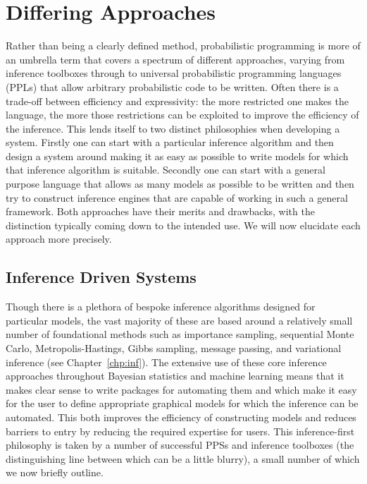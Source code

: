 
\section{Differing Approaches}
\label{sec:probprog:two}

Rather than being a clearly defined method,
probabilistic programming is more of an umbrella term that covers a spectrum of 
different approaches, varying from inference toolboxes through to universal probabilistic programming
languages (PPLs) that allow
arbitrary probabilistic code to be written.
Often there is a trade-off between efficiency and expressivity: the more restricted
one makes the language, the more those restrictions can be exploited to improve the efficiency
of the inference.  This lends itself to two distinct philosophies when developing a system. 
Firstly one can start with a particular inference algorithm and then design a system around making it as
easy as possible to write models for which that inference algorithm is suitable.  Secondly one can start
with  a general purpose language that allows as many models as possible to be written and then try to construct
inference engines that are capable of working in such a general framework.  Both approaches 
have their merits and drawbacks, with the distinction typically coming down to the intended use.
We will now elucidate each approach more precisely.  

\subsection{Inference Driven Systems}
\label{sec:probprog:two:inf}

Though there is a plethora of bespoke inference algorithms designed for particular models, the vast majority of these are based around
a relatively small number of foundational methods such as importance sampling, sequential Monte Carlo,
Metropolis-Hastings, Gibbs sampling, message passing, and variational inference (see Chapter~\ref{chp:inf}).
The extensive use of these core inference approaches throughout Bayesian statistics and machine
learning means that it makes clear sense to write packages for automating them and which
make it easy for the user to define appropriate graphical models for which the inference can be automated.
This both improves the efficiency of constructing models and reduces barriers to entry by reducing the
required expertise for users.  This inference-first philosophy is taken by a number of successful PPSs
and inference toolboxes (the distinguishing line between which can be a little blurry), a small number of which we now 
briefly outline.

